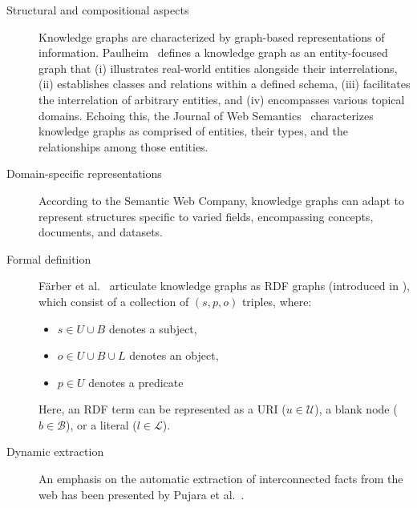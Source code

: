\begin{description}
    \item[Structural and compositional aspects] Knowledge graphs are characterized by graph-based representations of information. Paulheim~\cite{Paulheim2016KnowledgeGR} defines a knowledge graph as an entity-focused graph that (i) illustrates real-world entities alongside their interrelations, (ii) establishes classes and relations within a defined schema, (iii) facilitates the interrelation of arbitrary entities, and (iv) encompasses various topical domains. Echoing this, the Journal of Web Semantics~\cite{Kroetsch2016knowledge} characterizes knowledge graphs as comprised of entities, their types, and the relationships among those entities.
    
    \item[Domain-specific representations] According to the Semantic Web Company, knowledge graphs can adapt to represent structures specific to varied fields, encompassing concepts, documents, and datasets.    
    
        \item[Formal definition] Färber et al.~\cite{Farber2016linked} articulate knowledge graphs as RDF graphs (introduced in ), which consist of a collection of $(s, p, o)$ triples, where:
    \begin{itemize}
        \item $s\in U \cup B$ denotes a subject,
        \item $o\in U\cup B\cup L$ denotes an object,
        \item $p\in U$ denotes a predicate
    \end{itemize}
    Here, an RDF term can be represented as a URI ($u\in \mathcal{U}$), a blank node ($b\in \mathcal{B}$), or a literal ($l\in \mathcal{L}$).
    
    \item[Dynamic extraction] An emphasis on the automatic extraction of interconnected facts from the web has been presented by Pujara et al.~\cite{Pujara2013KGIdentification}.
\end{description}

